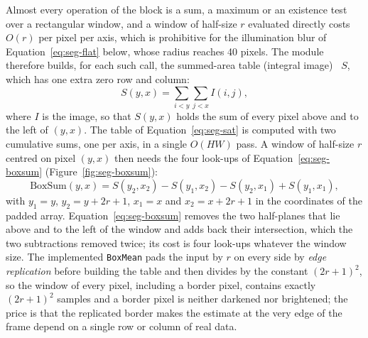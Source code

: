 Almost every operation of the block is a sum, a maximum or an existence test over a rectangular window, and a window of half-size $r$ evaluated directly costs $O(r)$ per pixel per axis, which is prohibitive for the illumination blur of Equation~\ref{eq:seg-flat} below, whose radius reaches 40 pixels.
The module therefore builds, for each such call, the summed-area table (integral image)~\cite{crow1984} $S$, which has one extra zero row and column:
\begin{equation}
S(y,x)=\sum_{i<y}\sum_{j<x} I(i,j),
\label{eq:seg-sat}
\end{equation}
where $I$ is the image, so that $S(y,x)$ holds the sum of every pixel above and to the left of $(y,x)$.
The table of Equation~\ref{eq:seg-sat} is computed with two cumulative sums, one per axis, in a single $O(HW)$ pass.
A window of half-size $r$ centred on pixel $(y,x)$ then needs the four look-ups of Equation~\ref{eq:seg-boxsum} (Figure~\ref{fig:seg-boxsum}):
\begin{equation}
\mathrm{BoxSum}(y,x)=S(y_2,x_2)-S(y_1,x_2)-S(y_2,x_1)+S(y_1,x_1),
\label{eq:seg-boxsum}
\end{equation}
with $y_1=y$, $y_2=y+2r+1$, $x_1=x$ and $x_2=x+2r+1$ in the coordinates of the padded array.
Equation~\ref{eq:seg-boxsum} removes the two half-planes that lie above and to the left of the window and adds back their intersection, which the two subtractions removed twice; its cost is four look-ups whatever the window size.
The implemented \texttt{BoxMean} pads the input by $r$ on every side by \emph{edge replication} before building the table and then divides by the constant $(2r+1)^2$, so the window of every pixel, including a border pixel, contains exactly $(2r+1)^2$ samples and a border pixel is neither darkened nor brightened; the price is that the replicated border makes the estimate at the very edge of the frame depend on a single row or column of real data.

